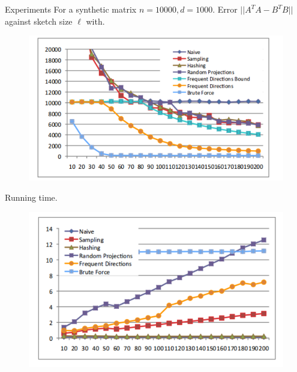 \documentclass[first=dgreen,second=purple,logo=redque]{aaltoslides}
\begin{document}
\begin{frame}[allowframebreaks=1]{Experiments}
For a synthetic matrix $n=10000, d=1000$. Error $||A^TA -B^TB||$ against sketch size $\ell$ with.
\begin{figure}
  \includegraphics[scale=0.6]{plots/acc}
 \label{fig:fp}
\end{figure}



\framebreak
Running time.
\begin{figure}
  \includegraphics[scale=0.6]{plots/time1}
\end{figure}


\end{frame}
\end{document}
